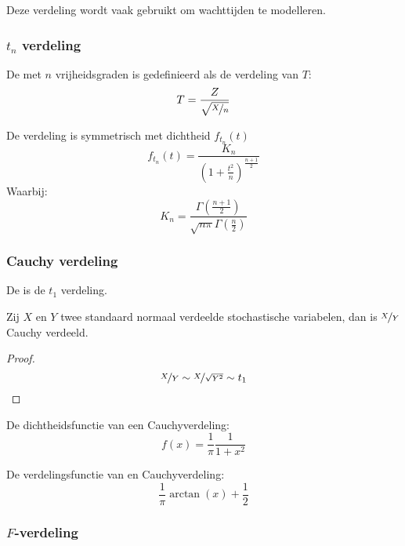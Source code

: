 \documentclass[main.tex]{subfiles}
\begin{document}
\begin{opm}
  Deze verdeling wordt vaak gebruikt om wachttijden te modelleren.
\end{opm}

\subsubsection{$t_n$ verdeling}
\label{sec:t_n-verdeling}

\begin{de}
  De  met $n$ vrijheidsgraden is gedefinieerd als de verdeling van $T$:
  \[ T = \frac{Z}{\sqrt{\nicefrac{X}{n}}} \]
\end{de}

\begin{st}
  De verdeling is symmetrisch met dichtheid $f_{t_{n}}(t)$
  \[ f_{t_{n}}(t) = \frac{K_{n}}{\left(1+\frac{t^{2}}{n}\right)^{\frac{n+1}{2}}} \]
  Waarbij:
  \[ K_{n} = \frac{\Gamma\left(\frac{n+1}{2}\right)}{\sqrt{n\pi}\Gamma\left(\frac{n}{2}\right)} \]
\zb
\end{st}

\subsubsection{Cauchy verdeling}
\label{sec:cauchy-verdeling}

\begin{de}
  De  is de $t_{1}$ verdeling.
\end{de}

\begin{ei}
  Zij $X$ en $Y$ twee standaard normaal verdeelde stochastische variabelen, dan is $\nicefrac{X}{Y}$ Cauchy verdeeld.

  \begin{proof}
    \[ \nicefrac{X}{Y} \sim \nicefrac{X}{\sqrt{Y^{2}}} \sim t_{1} \]
  \end{proof}
\end{ei}

\begin{st}
  De dichtheidsfunctie van een Cauchyverdeling:
  \[ f(x) = \frac{1}{\pi}\frac{1}{1+x^{2}} \]
\end{st}

\begin{st}
  De verdelingsfunctie van en Cauchyverdeling:
  \[ \frac{1}{\pi}\arctan(x) + \frac{1}{2} \]
\end{st}

\subsubsection{$F$-verdeling}
\label{sec:f-verdeling}
\end{document}
